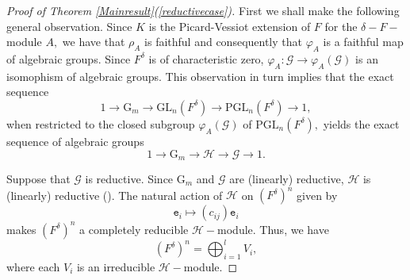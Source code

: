 \documentclass[preprint, 11pt]{amsart}
\theoremstyle{corollary}
\theoremstyle{remark}
\theoremstyle{proposition}
\numberwithin{equation}{subsection}
\begin{document}
\begin{proof}[Proof of Theorem \ref{Mainresult}(\ref{reductivecase})] First we shall make the following general observation. Since $K$ is the Picard-Vessiot extension of $F$ for the $\delta-F-$module $A,$ we have that $\rho_A$ is faithful and consequently that $\varphi_A$ is a faithful map of algebraic groups.  Since $F^\delta$ is of characteristic zero, $\varphi_A: \mathscr G\to \mathscr \varphi_A(\mathscr G)$ is an isomophism of  algebraic groups. This observation in turn implies that the  exact sequence $$1\to \mathrm{G}_m\to \mathrm{GL}_n(F^{\delta})\to \mathrm{PGL}_n(F^{\delta})\to 1,$$  when restricted to   the closed subgroup $\varphi_A(\mathscr{G})$ of $\mathrm{PGL}_n(F^{\delta}),$ yields 
	  the exact sequence of algebraic groups $$1\to \mathrm{G}_m\to \mathscr H \to \mathscr G\to 1.$$ 
	  
	  Suppose that $\mathscr G$ is reductive.  Since $\mathrm{G}_m$ and $\mathscr{G}$ are (linearly) reductive,  $\mathscr H$ is (linearly) reductive (\cite[Proposition 3.4]{Benedict-09}). The natural action of  $\mathscr H$ on $(F^{\delta})^n$ given by \begin{equation}\label{actiononideals-subspaces} \mathtt{e}_i\mapsto (c_{ij})\mathtt e_i\end{equation} makes $(F^{\delta})^n$ a completely reducible $\mathscr H-$module. Thus, we have \begin{equation}\label{decompvectorspace}(F^{\delta})^n=\bigoplus^l_{i=1} V_i,\end{equation} where each $V_i$ is an irreducible $\mathscr H-$module. 
	

\end{proof}
\end{document}
